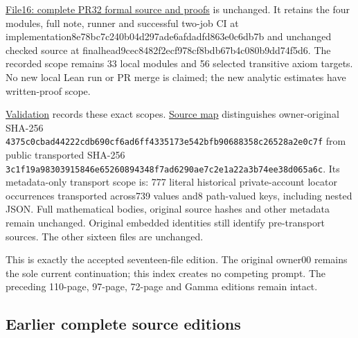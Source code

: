 \documentclass[
]{article}
\begin{document}
\href{https://github.com/KokunoYumeto/zeta-function-research-reader/blob/bf39bac055b76ce755b91401b35570bb84d76d9a/workbenches/splitzero-tandem/continuations/20260915-quotient-moment-continuation/16_PR32_FORMAL_SOURCE_AND_PROOFS.md}{File16:
complete PR32 formal source and proofs} is unchanged. It retains the
four modules, full note, runner and successful two-job CI at
implementation8e78bc7c240b04d297ade6afdadfd863e0c6db7b and unchanged
checked source at finalhead9cec8482f2ecf978cf8bdb67b4c080b9dd74f5d6. The
recorded scope remains 33 local modules and 56 selected transitive axiom
targets. No new local Lean run or PR merge is claimed; the new analytic
estimates have written-proof scope.

\href{https://github.com/KokunoYumeto/zeta-function-research-reader/blob/bf39bac055b76ce755b91401b35570bb84d76d9a/workbenches/splitzero-tandem/continuations/20260915-quotient-moment-continuation/12_VALIDATION.md}{Validation}
records these exact scopes.
\href{https://github.com/KokunoYumeto/zeta-function-research-reader/blob/bf39bac055b76ce755b91401b35570bb84d76d9a/workbenches/splitzero-tandem/continuations/20260915-quotient-moment-continuation/11_SOURCE_MAP.json}{Source
map} distinguishes owner-original SHA-256
\texttt{4375c0cbad44222cdb690cf6ad6ff4335173e542bfb90688358c26528a2e0c7f}
from public transported SHA-256
\texttt{3c1f19a98303915846e65260894348f7ad6290ae7c2e1a22a3b74ee38d065a6c}.
Its metadata-only transport scope is: 777 literal historical
private-account locator occurrences transported across739 values and8
path-valued keys, including nested JSON. Full mathematical bodies,
original source hashes and other metadata remain unchanged. Original
embedded identities still identify pre-transport sources. The other
sixteen files are unchanged.

This is exactly the accepted seventeen-file edition. The original
owner00 remains the sole current continuation; this index creates no
competing prompt. The preceding 110-page, 97-page, 72-page and Gamma
editions remain intact.

\subsection{Earlier complete source
editions}\label{earlier-complete-source-editions-1}
\end{document}
